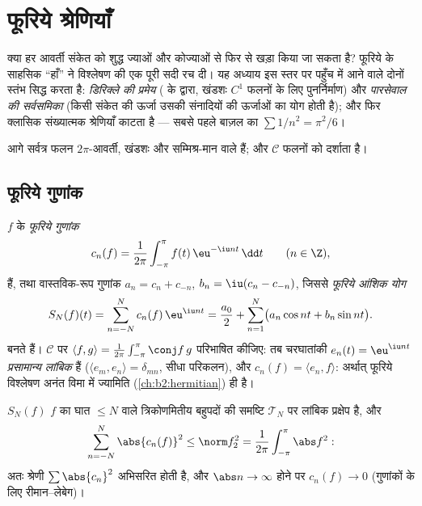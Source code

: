 \chapter{फूरिये श्रेणियाँ}\label{ch:b2:fourier}

क्या हर आवर्ती संकेत को शुद्ध ज्याओं और कोज्याओं से फिर से खड़ा किया जा
सकता है? फूरिये के साहसिक ``हाँ'' ने विश्लेषण की एक पूरी सदी रच दी। यह
अध्याय इस स्तर पर पहुँच में आने वाले दोनों स्तंभ सिद्ध करता है:
\emph{डिरिक्ले की प्रमेय} ( के द्वारा, खंडशः $C^1$ फलनों के
लिए  पुनर्निर्माण) और \emph{पारसेवाल की सर्वसमिका} (किसी संकेत की
ऊर्जा उसकी संनादियों की ऊर्जाओं का योग होती है); और फिर क्लासिक संख्यात्मक
श्रेणियाँ काटता है --- सबसे पहले बाज़ल का $\sum 1/n^2 =
\pi^2/6$।

आगे सर्वत्र फलन $2\pi$-आवर्ती, खंडशः  और सम्मिश्र-मान वाले हैं; और $\mathcal{C}$
 फलनों को दर्शाता है।

\section{फूरिये गुणांक}

\begin{definition}\label{def:b2:fourier:coefficients}
$f$ के \emph{फूरिये गुणांक}
\[
c_n(f) = \frac{1}{2\pi}\int_{-\pi}^{\pi} f(t)\,\eu^{-\iu n t}\,\dd
t \qquad (n \in \Z),
\]
हैं, तथा वास्तविक-रूप गुणांक $a_n = c_n + c_{-n}$, $b_n = \iu(c_n
- c_{-n})$, जिससे \emph{फूरिये आंशिक
योग}
\[
S_N(f)(t) = \sum_{n=-N}^{N} c_n(f)\,\eu^{\iu nt}
= \frac{a_0}{2} + \sum_{n=1}^{N}\bigl(a_n\cos nt + b_n \sin
nt\bigr).
\]
बनते हैं। $\mathcal{C}$ पर  $\langle f,
g\rangle = \frac{1}{2\pi}\int_{-\pi}^{\pi}\conj f\,g$ परिभाषित कीजिए: तब चरघातांकी $e_n(t) = \eu^{\iu nt}$
\emph{प्रसामान्य लांबिक} हैं ($\langle e_m, e_n\rangle = \delta_{mn}$, सीधा परिकलन), और $c_n(f) = \langle e_n, f\rangle$: अर्थात् फूरिये
विश्लेषण अनंत विमा में  ज्यामिति (\cref{ch:b2:hermitian}) ही है।
\end{definition}

\begin{proposition}[बेसेल असमिका]\label{prop:b2:fourier:bessel}
$S_N(f)$ $f$ का घात $\leq N$ वाले त्रिकोणमितीय बहुपदों की समष्टि $\mathcal{T}_N$ पर लांबिक
प्रक्षेप है, और
\[
\sum_{n=-N}^{N} \abs{c_n(f)}^2 \leq \norm f_2^2 =
\frac{1}{2\pi}\int_{-\pi}^{\pi} \abs f^2 :
\]
अतः श्रेणी $\sum \abs{c_n}^2$ अभिसरित होती है, और $\abs n \to \infty$ होने पर $c_n(f) \to 0$ (गुणांकों के लिए
रीमान--लेबेग)।
\end{proposition}

